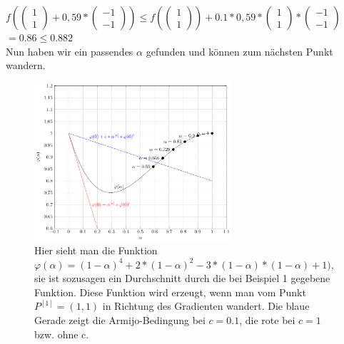 \documentclass[naustrian]{article}
\begin{document}
{\begin{enumerate}
    $f( \left( \begin{array}{c} 1 \\ 1 \end{array} \right) + 0,59 * \left( \begin{array}{c} -1 \\ -1 \end{array} \right)) \leq f(\left( \begin{array}{c} 1 \\ 1 \end{array} \right)) + 0.1 * 0,59 *  \left( \begin{array}{c} 1 \\ 1 \end{array} \right) * \left( \begin{array}{c} -1 \\ -1 \end{array} \right)$ \\
    $= 0.86 \leq 0.882$ \\
    Nun haben wir ein passendes $\alpha$ gefunden und können zum nächsten Punkt wandern.

    \begin{figure}[h]
        \centering
        \includegraphics[width=0.65\textwidth]{grad/figure3}
        \caption[Die Armijo-Bedingung] {Hier sieht man die Funktion $\varphi(\alpha)=(1-\alpha)^4+2*(1-\alpha)^2-3*(1-\alpha)*(1-\alpha)+1)$, sie ist sozusagen ein Durchschnitt durch die bei Beispiel 1 gegebene Funktion. Diese Funktion wird erzeugt, wenn man vom Punkt $P^{[1]}=(1,1)$ in Richtung des Gradienten wandert. Die blaue Gerade zeigt die Armijo-Bedingung bei $c=0.1$, die rote bei $c=1$ bzw. ohne c.}
    \end{figure}


\end{enumerate}}
\end{document}
